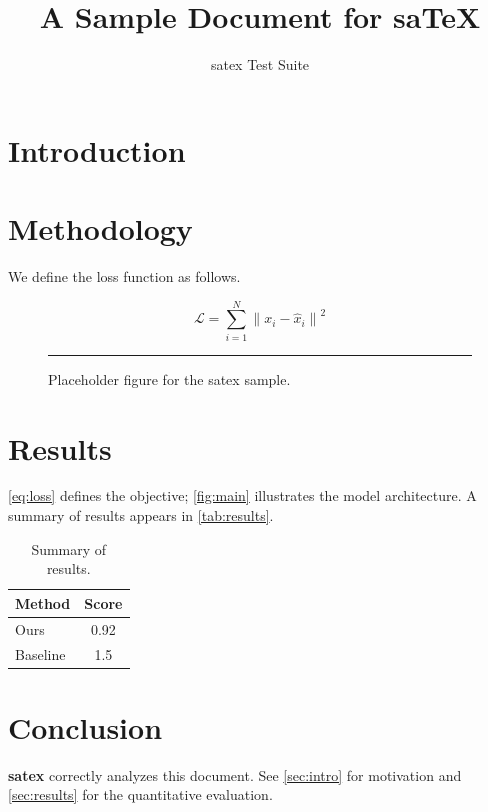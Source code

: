 \documentclass[11pt]{article}
\newif\ifdraft
\newcommand{\highlight}[1]{\textbf{#1}}
\newcommand{\norm}[1]{\left\lVert#1\right\rVert}
\begin{document}
\def\DocName{Document}
\title{A Sample \DocName{} for sa\TeX}
\author{satex Test Suite}
\maketitle

\section{Introduction}
\label{sec:intro}
\ifdraft
This document exercises \highlight{satex}, a static analyser for \LaTeX{}.
See \autoref{sec:method} for the methodology and \autoref{sec:results} for
the results.
\fi

\section{Methodology}
\label{sec:method}

We define the loss function as follows.

\begin{equation}
  \label{eq:loss}
  \mathcal{L} = \sum_{i=1}^{N} \norm{x_i - \hat{x}_i}^2
\end{equation}

\begin{figure}[ht]
  \centering
  \rule{0.4\linewidth}{0.3pt}
  \caption{Placeholder figure for the satex sample.}
  \label{fig:main}
\end{figure}

\section{Results}
\label{sec:results}

\autoref{eq:loss} defines the objective; \autoref{fig:main} illustrates the
model architecture.  A summary of results appears in \autoref{tab:results}.

\begin{table}[ht]
  \centering
  \caption{Summary of results.}
  \label{tab:results}
  \begin{tabular}{lc}
    Method & Score \\ \hline
    Ours     & 0.92  \\
    Baseline & 1.5   \\
  \end{tabular}
\end{table}

\section{Conclusion}
\label{sec:conclusion}

\highlight{satex} correctly analyzes this document.
See \autoref{sec:intro} for motivation and \autoref{sec:results} for
the quantitative evaluation.
\end{document}
